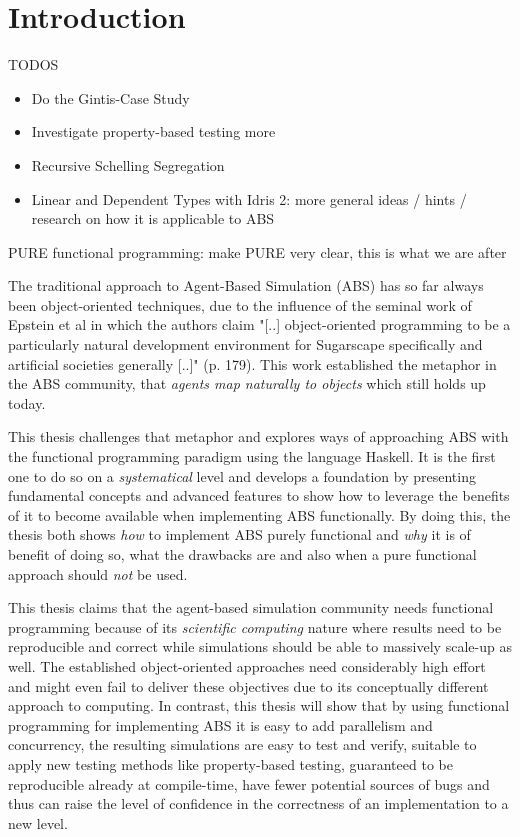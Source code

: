 \chapter{Introduction}
TODOS
\begin{itemize}
	\item Do the Gintis-Case Study
	\item Investigate property-based testing more
	\item Recursive Schelling Segregation
	\item Linear and Dependent Types with Idris 2: more general ideas / hints / research on how it is applicable to ABS
\end{itemize}

PURE functional programming: make PURE very clear, this is what we are after

The traditional approach to Agent-Based Simulation (ABS) has so far always been object-oriented techniques, due to the influence of the seminal work of Epstein et al \cite{epstein_growing_1996} in which the authors claim "[..] object-oriented programming to be a particularly natural development environment for Sugarscape specifically and artificial societies generally [..]" (p. 179). This work established the metaphor in the ABS community, that \textit{agents map naturally to objects} \cite{north_managing_2007} which still holds up today.

This thesis challenges that metaphor and explores ways of approaching ABS with the functional programming paradigm using the language Haskell. It is the first one to do so on a \textit{systematical} level and develops a foundation by presenting fundamental concepts and advanced features to show how to leverage the benefits of it \cite{hudak_haskell_1994, hudak_history_2007} to become available when implementing ABS functionally. By doing this, the thesis both shows \textit{how} to implement ABS purely functional and \textit{why} it is of benefit of doing so, what the drawbacks are and also when a pure functional approach should \textit{not} be used. 

This thesis claims that the agent-based simulation community needs functional programming because of its \textit{scientific computing} nature where results need to be reproducible and correct while simulations should be able to massively scale-up as well. The established object-oriented approaches need considerably high effort and might even fail to deliver these objectives due to its conceptually different approach to computing. In contrast, this thesis will show that by using functional programming for implementing ABS it is easy to add parallelism and concurrency, the resulting simulations are easy to test and verify, suitable to apply new testing methods like property-based testing, guaranteed to be reproducible already at compile-time, have fewer potential sources of bugs and thus can raise the level of confidence in the correctness of an implementation to a new level.

